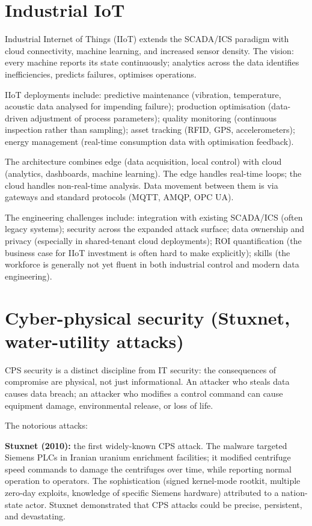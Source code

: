 \section{Industrial IoT}

Industrial Internet of Things (IIoT) extends the SCADA/ICS paradigm with cloud connectivity, machine learning, and increased sensor density. The vision: every machine reports its state continuously; analytics across the data identifies inefficiencies, predicts failures, optimises operations.

IIoT deployments include: predictive maintenance (vibration, temperature, acoustic data analysed for impending failure); production optimisation (data-driven adjustment of process parameters); quality monitoring (continuous inspection rather than sampling); asset tracking (RFID, GPS, accelerometers); energy management (real-time consumption data with optimisation feedback).

The architecture combines edge (data acquisition, local control) with cloud (analytics, dashboards, machine learning). The edge handles real-time loops; the cloud handles non-real-time analysis. Data movement between them is via gateways and standard protocols (MQTT, AMQP, OPC UA).

The engineering challenges include: integration with existing SCADA/ICS (often legacy systems); security across the expanded attack surface; data ownership and privacy (especially in shared-tenant cloud deployments); ROI quantification (the business case for IIoT investment is often hard to make explicitly); skills (the workforce is generally not yet fluent in both industrial control and modern data engineering).

\section{Cyber-physical security (Stuxnet, water-utility attacks)}

CPS security is a distinct discipline from IT security: the consequences of compromise are physical, not just informational. An attacker who steals data causes data breach; an attacker who modifies a control command can cause equipment damage, environmental release, or loss of life.

The notorious attacks:

\textbf{Stuxnet (2010):} the first widely-known CPS attack. The malware targeted Siemens PLCs in Iranian uranium enrichment facilities; it modified centrifuge speed commands to damage the centrifuges over time, while reporting normal operation to operators. The sophistication (signed kernel-mode rootkit, multiple zero-day exploits, knowledge of specific Siemens hardware) attributed to a nation-state actor. Stuxnet demonstrated that CPS attacks could be precise, persistent, and devastating.

